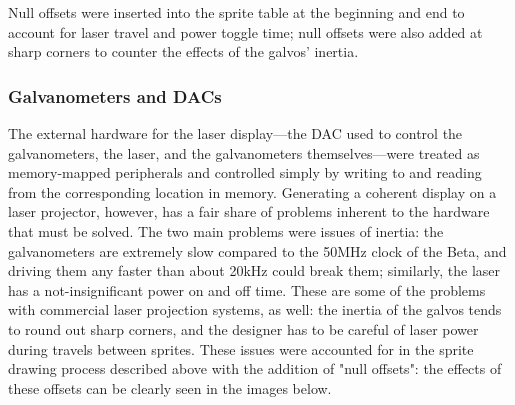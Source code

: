 \documentclass{article}
\begin{document}
Null offsets were inserted into the sprite table at the beginning and end to account for laser travel and power toggle time; null offsets were also added at sharp corners to counter the effects of the galvos' inertia.

\subsubsection{Galvanometers and DACs} \label{galvos}

The external hardware for the laser display—the DAC used to control the galvanometers, the laser, and the galvanometers themselves—were treated as memory-mapped peripherals and controlled simply by writing to and reading from the corresponding location in memory. Generating a coherent display on a laser projector, however, has a fair share of problems inherent to the hardware that must be solved. The two main problems were issues of inertia: the galvanometers are extremely slow compared to the 50MHz clock of the Beta, and driving them any faster than about 20kHz could break them; similarly, the laser has a not-insignificant power on and off time. These are some of the problems with commercial laser projection systems, as well: the inertia of the galvos tends to round out sharp corners, and the designer has to be careful of laser power during travels between sprites. These issues were accounted for in the sprite drawing process described above with the addition of "null offsets": the effects of these offsets can be clearly seen in the images below.
\end{document}
